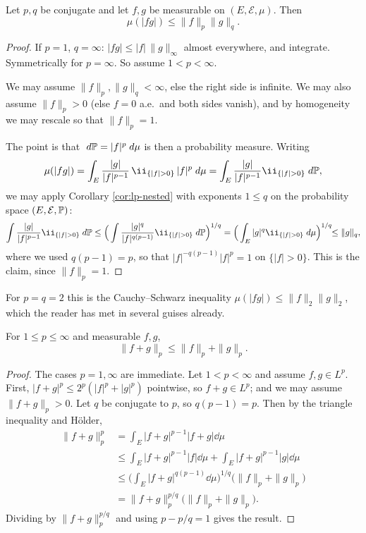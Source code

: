 \documentclass[a4paper]{scrartcl}
\newcommand{\cE}{\mathcal{E}}
\newcommand{\ind}{\ii}
\begin{document}
\begin{theorem}\label{pm-thm:holder}
	Let $p,q$ be conjugate and let $f,g$ be measurable on $(E,\cE,\mu)$. Then
	$$
	\mu(|fg|) \leq \|f\|_p\|g\|_q.
	$$
\end{theorem}
\begin{proof}
	If $p=1$, $q=\infty$: $|fg|\leq |f|\,\|g\|_\infty$ almost everywhere, and integrate. Symmetrically for $p = \infty$. So assume $1<p<\infty$.

	We may assume $\|f\|_p, \|g\|_q < \infty$, else the right side is infinite. We may also assume $\|f\|_p > 0$ (else $f = 0$ a.e.\ and both sides vanish), and by homogeneity we may rescale so that $\|f\|_p = 1$.

	The point is that $\; d\mathbb{P} = |f|^p\; d\mu$ is then a probability measure. Writing
	$$
	\mu(|fg|) = \int_E \frac{|g|}{|f|^{p-1}}\,\ind_{\{|f|>0\}}\,|f|^p\dd\mu = \int_E \frac{|g|}{|f|^{p-1}}\ind_{\{|f|>0\}}\dd\PP,
	$$
	we may apply Corollary \ref{cor:lp-nested} with exponents $1 \leq q$ on the probability space $(E,\cE,\PP)$:
	$$
	\int \frac{|g|}{|f|^{p-1}}\ind_{\{|f|>0\}}\dd\PP \leq \Big( \int \frac{|g|^q}{|f|^{q(p-1)}}\ind_{\{|f|>0\}}\dd\PP\Big)^{1/q} = \Big( \int_E |g|^q \ind_{\{|f|>0\}}\dd\mu\Big)^{1/q}\!\! \leq \|g\|_q,
	$$
	where we used $q(p-1) = p$, so that $|f|^{-q(p-1)}|f|^p = 1$ on $\{|f|>0\}$. This is the claim, since $\|f\|_p=1$.
\end{proof}

\begin{remark}
	For $p = q = 2$ this is the Cauchy--Schwarz inequality $\mu(|fg|) \leq \|f\|_2\|g\|_2$, which the reader has met in several guises already.
\end{remark}

\begin{theorem}\label{pm-thm:minkowski}
	For $1\leq p\leq\infty$ and measurable $f,g$,
	$$
	\|f+g\|_p \leq \|f\|_p+\|g\|_p.
	$$
\end{theorem}
\begin{proof}
	The cases $p=1,\infty$ are immediate. Let $1<p<\infty$ and assume $f,g \in L^p$. First, $|f+g|^p \leq 2^p(|f|^p+|g|^p)$ pointwise, so $f + g \in L^p$; and we may assume $\|f+g\|_p>0$. Let $q$ be conjugate to $p$, so $q(p-1)=p$. Then by the triangle inequality and H\"older,
	\begin{align*}
		\|f+g\|_p^p &= \int_E |f+g|^{p-1}|f+g|\dd\mu \\
		&\leq \int_E |f+g|^{p-1}|f|\dd\mu + \int_E |f+g|^{p-1}|g|\dd\mu\\
		&\leq \Big(\int_E |f+g|^{q(p-1)}\dd\mu\Big)^{1/q}\big(\|f\|_p+\|g\|_p\big)\\
		&= \|f+g\|_p^{p/q}\big(\|f\|_p+\|g\|_p\big).
	\end{align*}
	Dividing by $\|f+g\|_p^{p/q}$ and using $p - p/q = 1$ gives the result.
\end{proof}
\end{document}
